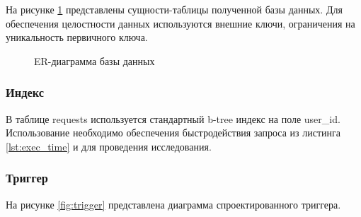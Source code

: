 На рисунке \ref{fig:dr-er} представлены сущности-таблицы полученной базы данных. Для обеспечения целостности данных используются внешние ключи, ограничения на уникальность первичного ключа.

\begin{figure}[h!]
	\caption{ER-диаграмма базы данных}
	\label{fig:dr-er}
\end{figure}

\subsubsection{Индекс}

В таблице requests используется стандартный b-tree индекс на поле user{\_}id. Использование необходимо обеспечения быстродействия запроса из листинга \ref{lst:exec_time} и для проведения исследования.


\subsubsection{Триггер}

На рисунке \ref{fig:trigger} представлена диаграмма спроектированного триггера.

